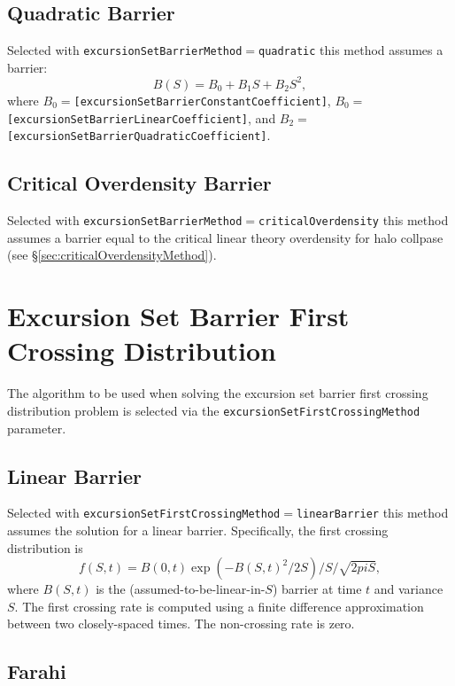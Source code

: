 \subsection{Quadratic Barrier}

Selected with {\tt excursionSetBarrierMethod}$=${\tt quadratic} this method assumes a barrier:
\begin{equation}
B(S) = B_0 + B_1 S + B_2 S^2,
\end{equation}
where $B_0=${\tt [excursionSetBarrierConstantCoefficient]},  $B_0=${\tt [excursionSetBarrierLinearCoefficient]}, and $B_2=${\tt [excursionSetBarrierQuadraticCoefficient]}.

\subsection{Critical Overdensity Barrier}

Selected with {\tt excursionSetBarrierMethod}$=${\tt criticalOverdensity} this method assumes a barrier equal to the critical linear theory overdensity for halo collpase (see \S\ref{sec:criticalOverdensityMethod}).

\section{Excursion Set Barrier First Crossing Distribution}

The algorithm to be used when solving the excursion set barrier first crossing distribution problem is selected via the {\tt excursionSetFirstCrossingMethod} parameter.

\subsection{Linear Barrier}

Selected with {\tt excursionSetFirstCrossingMethod}$=${\tt linearBarrier} this method assumes the solution for a linear barrier. Specifically, the first crossing distribution is
\begin{equation}
 f(S,t) = B(0,t) \exp(- B(S,t)^2/2S)/S/\sqrt{2 pi S},
\end{equation}
where $B(S,t)$ is the (assumed-to-be-linear-in-$S$) barrier at time $t$ and variance $S$. The first crossing rate is computed using a finite difference approximation between two closely-spaced times. The non-crossing rate is zero.

\subsection{Farahi}

